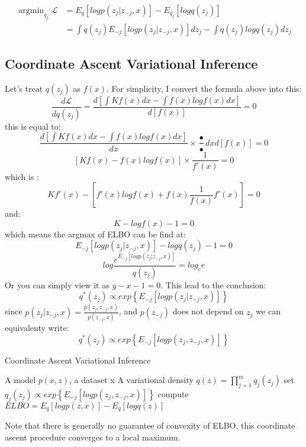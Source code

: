 \documentclass{article}
\begin{document}
\begin{align*}
\mathop{\arg\min}_{q_{j}} \mathcal{L} &=E_{q}[logp(z_{j}|z_{-j},x)]-E_{q_{j}}[logq(z_{j})] \\
&= \int q(z_{j})E_{-j}[logp(z_{j}|z_{-j},x)]dz_{j}-\int q(z_{j})logq(z_{j})dz_{j}
\end{align*}

\subsection{Coordinate Ascent Variational Inference}
Let's treat $q(z_{j})$ as $f(x)$.
For simplicity, I convert the formula above into this:
$$\frac{d \mathcal{L}}{dq(z_{j})}=\frac{d[\int Kf(x)dx- \int f(x)logf(x)dx]}{d[f(x)]}=0$$
this is equal to:
$$\frac{d[\int Kf(x)dx- \int f(x)logf(x)dx]}{dx} \times \frac{•}{•}{dx}{d[f(x)]}=0$$
$$ [ K f(x)-f(x)logf(x)] \times \frac{1}{f'(x)}=0$$
which is :
$$Kf'(x)-[f'(x)logf(x)+f(x) \frac{1}{f(x)}f'(x)]  =0$$
and:
$$K-logf(x)-1=0$$
which means the argmax of ELBO can be find at: 
$$E_{-j}[logp(z_{j}|z_{-j},x)]-logq(z_{j})-1=0$$
$$log \frac{ e^{E_{-j}[logp(z_{j}|z_{-j},x)]}}{q(z_{j})}= log_{e}e $$
Or you can simply view it as $y-x-1=0$.
This lead to the conclusion:
$$q^{*}(z_{j}) \propto exp \left\{ E_{-j}[logp(z_{j}|z_{-j},x)] \right\}$$
since $p(z_{j}|z_{-j},x)=\frac{p(z_{j},z_{-j},x)}{p(z_{-j},x)} $, and $p(z_{-j})$ does not depend on $z_{j}$ we can equivalenty write:
$$q^{*}(z_{j}) \propto exp \left\{ E_{-j}[logp(z_{j},z_{-j},x)] \right\}$$

\renewcommand{\algorithmicrequire}{ \textbf{Input:}}
\renewcommand{\algorithmicensure}{ \textbf{Output:}}

\begin{algorithm}
\caption{Coordinate Ascent Variational Inference}
\begin{algorithmic}
\REQUIRE A model $p(x,z)$, a dataset x
\ENSURE A variational density $q(z)=\prod_{j=1}^{m}q_{j}(z_{j})$
\STATE set $q_{j}(z_{j}) \propto exp \left\{ E_{-j}[logp(z_{j},z_{-j},x)] \right\}$ 
\ENDFOR
\STATE compute $ELBO=E_{q}[logp(z,x)]-E_{q}[logq(z)]$ 
\ENDWHILE 
\end{algorithmic}
\end{algorithm}

Note that there is generally no guarantee of convexity of ELBO, this coordinate ascent procedure converges to a local maximum.
\end{document}
